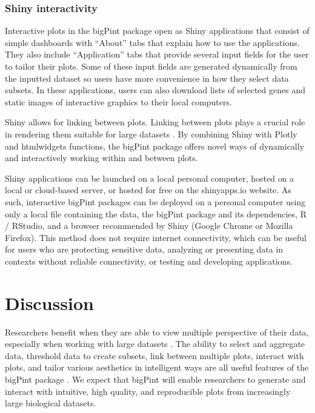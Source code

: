 \documentclass[parskip=full]{bmcart}
\begin{document}
\subsubsection*{Shiny interactivity}

Interactive plots in the bigPint package open as Shiny applications that consist of simple dashboards with ``About'' tabs that explain how to use the applications. They also include ``Application'' tabs that provide several input fields for the user to tailor their plots. Some of these input fields are generated dynamically from the inputted dataset so users have more convenience in how they select data subsets. In these applications, users can also download lists of selected genes and static images of interactive graphics to their local computers. 

Shiny allows for linking between plots. Linking between plots plays a crucial role in rendering them suitable for large datasets \cite{nguyen2016deep, albuquerque2009quality, heinrich2012parallel}. By combining Shiny with Plotly and htmlwidgets functions, the bigPint package offers novel ways of dynamically and interactively working within and between plots.

Shiny applications can be launched on a local personal computer, hosted on a local or cloud-based server, or hosted for free on the shinyapps.io website. As such, interactive bigPint packages can be deployed on a personal computer using only a local file containing the data, the bigPint package and its dependencies, R / RStudio, and a browser recommended by Shiny (Google Chrome or Mozilla Firefox). This method does not require internet connectivity, which can be useful for users who are protecting sensitive data, analyzing or presenting data in contexts without reliable connectivity, or testing and developing applications.

\section*{Discussion}

Researchers benefit when they are able to view multiple perspective of their data, especially when working with large datasets \cite{swayne2003ggobi, cook2007interactive}. The ability to select and aggregate data, threshold data to create subsets, link between multiple plots, interact with plots, and tailor various aesthetics in intelligent ways are all useful features of the bigPint package \cite{o2010visualizing, pavlopoulos2015visualizing, kerren2007human}. We expect that bigPint will enable researchers to generate and interact with intuitive, high quality, and reproducible plots from increasingly large biological datasets. 
\end{document}
